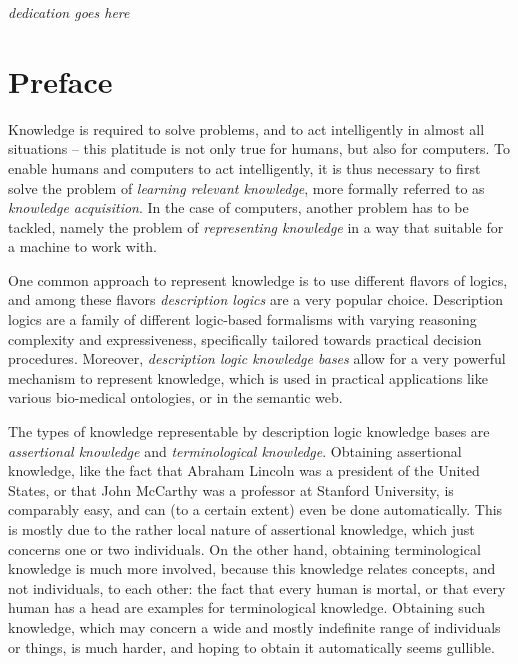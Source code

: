 \vspace*{23ex}

\centerline{\textit{dedication goes here}}

\chapter*{Preface}
\label{cha:preface}

\thispagestyle{empty}

Knowledge is required to solve problems, and to act intelligently in almost all situations
-- this platitude is not only true for humans, but also for computers.  To enable humans
and computers to act intelligently, it is thus necessary to first solve the problem of
\emph{learning relevant knowledge}, more formally referred to as \emph{knowledge
  acquisition}.  In the case of computers, another problem has to be tackled, namely the
problem of \emph{representing knowledge} in a way that suitable for a machine to work
with.

One common approach to represent knowledge is to use different flavors of logics, and
among these flavors \emph{description logics} are a very popular choice.  Description
logics are a family of different logic-based formalisms with varying reasoning complexity
and expressiveness, specifically tailored towards practical decision procedures.
Moreover, \emph{description logic knowledge bases} allow for a very powerful mechanism to
represent knowledge, which is used in practical applications like various bio-medical
ontologies, or in the semantic web.

The types of knowledge representable by description logic knowledge bases are
\emph{assertional knowledge} and \emph{terminological knowledge}.  Obtaining assertional
knowledge, like the fact that Abraham Lincoln was a president of the United States, or
that John McCarthy was a professor at Stanford University, is comparably easy, and can (to
a certain extent) even be done automatically.  This is mostly due to the rather local
nature of assertional knowledge, which just concerns one or two individuals.  On the other
hand, obtaining terminological knowledge is much more involved, because this knowledge
relates concepts, and not individuals, to each other: the fact that every human is mortal,
or that every human has a head are examples for terminological knowledge.  Obtaining such
knowledge, which may concern a wide and mostly indefinite range of individuals or things,
is much harder, and hoping to obtain it automatically seems gullible.

